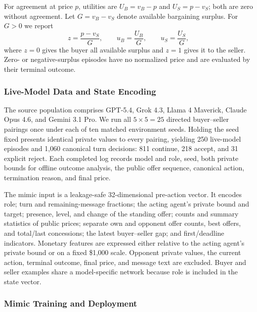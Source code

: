 For agreement at price $p$, utilities are $U_B=v_B-p$ and $U_S=p-v_S$; both are zero without agreement. Let $G=v_B-v_S$ denote available bargaining surplus. For $G>0$ we report
\begin{equation}
z=\frac{p-v_S}{G},\qquad
u_B=\frac{U_B}{G},\qquad
u_S=\frac{U_S}{G},
\end{equation}
where $z=0$ gives the buyer all available surplus and $z=1$ gives it to the seller. Zero- or negative-surplus episodes have no normalized price and are evaluated by their terminal outcome.

\subsubsection{Live-Model Data and State Encoding}

The source population comprises GPT-5.4, Grok 4.3, Llama 4 Maverick, Claude Opus 4.6, and Gemini 3.1 Pro. We run all $5\times5=25$ directed buyer--seller pairings once under each of ten matched environment seeds. Holding the seed fixed presents identical private values to every pairing, yielding 250 live-model episodes and 1{,}060 canonical turn decisions: 811 continue, 218 accept, and 31 explicit reject. Each completed log records model and role, seed, both private bounds for offline outcome analysis, the public offer sequence, canonical action, termination reason, and final price.

The mimic input is a leakage-safe 32-dimensional pre-action vector. It encodes role; turn and remaining-message fractions; the acting agent's private bound and target; presence, level, and change of the standing offer; counts and summary statistics of public prices; separate own and opponent offer counts, best offers, and total/last concessions; the latest buyer--seller gap; and first/deadline indicators. Monetary features are expressed either relative to the acting agent's private bound or on a fixed \$1{,}000 scale. Opponent private values, the current action, terminal outcome, final price, and message text are excluded. Buyer and seller examples share a model-specific network because role is included in the state vector.

\subsubsection{Mimic Training and Deployment}

